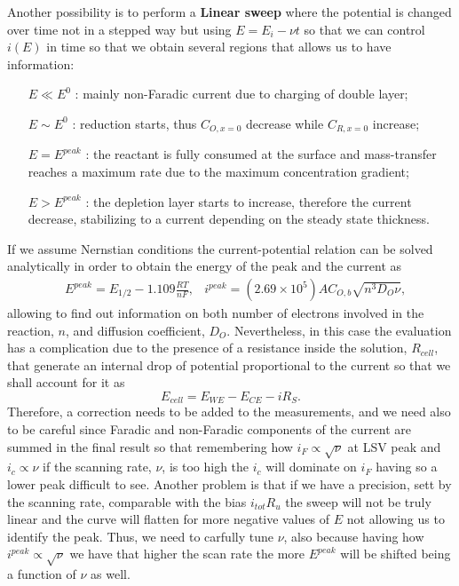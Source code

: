 Another possibility is to perform a \textbf{Linear sweep} where the potential is changed over time not in a stepped way but using $E = E_i - \nu t$ so that we can control $i(E)$ in time so that we obtain several regions that allows us to have information:
\begin{itemize}[align=left, leftmargin=*]
    \item[$E\ll E^0$]: mainly non-Faradic current due to charging of double layer;
    \item[$E\sim E^0$]: reduction starts, thus $C_{O, x=0}$ decrease while $C_{R, x=0}$ increase;
    \item[$E=E^{peak}$]: the reactant is fully consumed at the surface and mass-transfer reaches a maximum rate due to the maximum concentration gradient;
    \item[$E > E^{peak}$]: the depletion layer starts to increase, therefore the current decrease, stabilizing to a current depending on the steady state thickness.
\end{itemize}
If we assume Nernstian conditions the current-potential relation can be solved analytically in order to obtain the energy of the peak and the current as
\begin{align}
    &E^{peak} = E_{1/2} - 1.109\frac{RT}{nF}, &i^{peak} = (2.69\times 10^5)AC_{O,b}\sqrt{n^3 D_O\nu},
\end{align}
allowing to find out information on both number of electrons involved in the reaction, $n$, and diffusion coefficient, $D_O$. Nevertheless, in this case the evaluation has a complication due to the presence of a resistance inside the solution, $R_{cell}$, that generate an internal drop of potential proportional to the current so that we shall account for it as
\begin{equation}
    E_{cell} = E_{WE} - E_{CE} - iR_S.
\end{equation}
Therefore, a correction needs to be added to the measurements, and we need also to be careful since Faradic and non-Faradic components of the current are summed in the final result so that remembering how $i_F \propto \sqrt{\nu}$ at LSV peak and $i_c \propto \nu$ if the scanning rate, $\nu$, is too high the $i_c$ will dominate on $i_F$ having so a lower peak difficult to see. Another problem is that if we have a precision, sett by the scanning rate, comparable with the bias $i_{tot}R_u$ the sweep will not be truly linear and the curve will flatten for more negative values of $E$ not allowing us to identify the peak. Thus, we need to carfully tune $\nu$, also because having how $i^{peak} \propto \sqrt{\nu}$ we have that higher the scan rate the more $E^{peak}$ will be shifted being a function of $\nu$ as well.

